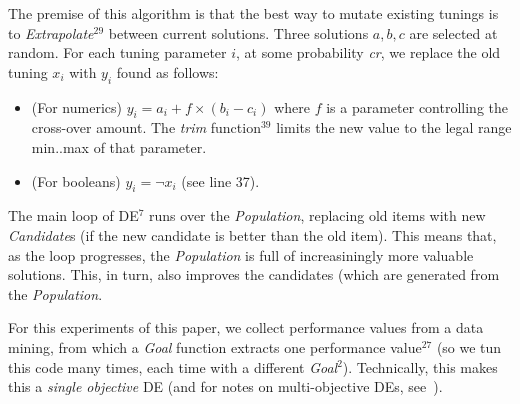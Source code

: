 \documentclass{sig-alternative}
\newcommand{\bi}{\begin{itemize}[leftmargin=0.4cm]}
\newcommand{\ei}{\end{itemize}}
\begin{document}
The premise of this algorithm is that the best way to mutate existing tunings
is to {\em Extrapolate}$^{29}$
between current solutions.  Three solutions $a,b,c$ are selected at random.
For each tuning parameter $i$, at some probability {\em cr}, we replace
the old tuning $x_i$ with $y_i$ found as follows:
\bi
\item (For numerics) $y_i = a_i+f \times (b_i - c_i)$   where $f$ is a parameter
controlling the cross-over amount.  The {\em trim} function$^{39}$ limits the new
value to the legal range min..max of that parameter.
\item (For booleans) $y_i= \neg x_i$ (see line 37).
\ei
The main loop of DE$^7$ runs over the {\em Population}, replacing old items
with new {\em Candidate}s (if the new candidate is better than the old item).
This means that, as the loop progresses, the {\em Population} is full of increasiningly
more valuable solutions. This, in turn, also improves  the candidates (which are generated
from the {\em Population}.

For this experiments of this paper, we collect performance
values from a data mining, from which a {\em Goal} function extracts one 
performance value$^{27}$ (so we tun this code many times, each time with
a different {\em Goal}$^2$).  Technically, this makes this a  {\em single objective} DE (and for notes on multi-objective DEs, see~\cite{Coello05,zhang07,5583335}).


\end{document}
